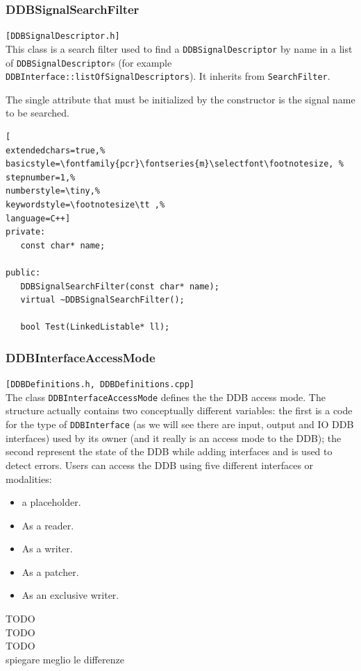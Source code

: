 \subsubsection{DDBSignalSearchFilter}
\texttt{[DDBSignalDescriptor.h]}\\
This class is a search filter used to find a \texttt{DDBSignalDescriptor} by name in a list of \texttt{DDBSignalDescriptor}s (for example \texttt{DDBInterface::listOfSignalDescriptors}). It inherits from \texttt{SearchFilter}.

The single attribute that must be initialized by the constructor is the signal name to be searched.

\begin{lstlisting}[
extendedchars=true,%
basicstyle=\fontfamily{pcr}\fontseries{m}\selectfont\footnotesize, %
stepnumber=1,%
numberstyle=\tiny,%
keywordstyle=\footnotesize\tt ,%
language=C++]
private:
   const char* name;

public:
   DDBSignalSearchFilter(const char* name);
   virtual ~DDBSignalSearchFilter();

   bool Test(LinkedListable* ll);
\end{lstlisting}



\subsubsection{DDBInterfaceAccessMode}
\texttt{[DDBDefinitions.h, DDBDefinitions.cpp]}\\
The class \texttt{DDBInterfaceAccessMode} defines the the DDB access mode. The structure actually contains two conceptually different variables: the first is a code for the type of \texttt{DDBInterface} (as we will see there are input, output and IO DDB interfaces) used by its owner (and it really is an access mode to the DDB); the second represent the state of the DDB while adding interfaces and is used to detect errors. Users can access the DDB using five different interfaces or modalities:

\begin{itemize}
 \item a placeholder.
 \item As a reader.
 \item As a writer.
 \item As a patcher.
 \item As an exclusive writer.
\end{itemize}

TODO\\
TODO\\
TODO\\
spiegare meglio le differenze

